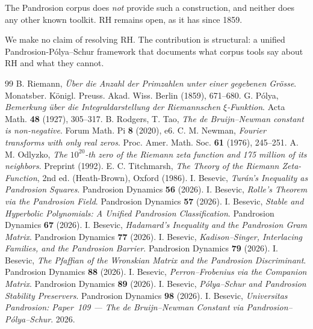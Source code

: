\documentclass[11pt,a4paper]{article}
\begin{document}
The Pandrosion corpus does \emph{not} provide such a construction, and
neither does any other known toolkit. RH remains open, as it has since 1859.

We make no claim of resolving RH. The contribution is structural: a unified
Pandrosion-P\'olya--Schur framework that documents what corpus tools say
about RH and what they cannot.

\begin{thebibliography}{99}
 B. Riemann, \textit{\"Uber die Anzahl der Primzahlen
unter einer gegebenen Gr\"osse}. Monatsber. K\"onigl. Preuss. Akad. Wiss.
Berlin (1859), 671--680.
 G. P\'olya, \textit{Bemerkung \"uber die Integraldarstellung
der Riemannschen $\xi$-Funktion}. Acta Math. \textbf{48} (1927), 305--317.
 B. Rodgers, T. Tao, \textit{The de Bruijn--Newman
constant is non-negative}. Forum Math. Pi \textbf{8} (2020), e6.
 C. M. Newman, \textit{Fourier transforms with only real
zeros}. Proc. Amer. Math. Soc. \textbf{61} (1976), 245--251.
 A. M. Odlyzko, \textit{The $10^{20}$-th zero of the Riemann
zeta function and 175 million of its neighbors}. Preprint (1992).
 E. C. Titchmarsh, \textit{The Theory of the Riemann
Zeta-Function}, 2nd ed. (Heath-Brown), Oxford (1986).
 I. Besevic, \textit{Tur\'an's Inequality as Pandrosion
Squares}. Pandrosion Dynamics \textbf{56} (2026).
 I. Besevic, \textit{Rolle's Theorem via the Pandrosion
Field}. Pandrosion Dynamics \textbf{57} (2026).
 I. Besevic, \textit{Stable and Hyperbolic Polynomials:
A Unified Pandrosion Classification}. Pandrosion Dynamics \textbf{67} (2026).
 I. Besevic, \textit{Hadamard's Inequality and the
Pandrosion Gram Matrix}. Pandrosion Dynamics \textbf{77} (2026).
 I. Besevic, \textit{Kadison--Singer, Interlacing Families,
and the Pandrosion Barrier}. Pandrosion Dynamics \textbf{79} (2026).
 I. Besevic, \textit{The Pfaffian of the Wronskian Matrix
and the Pandrosion Discriminant}. Pandrosion Dynamics \textbf{88} (2026).
 I. Besevic, \textit{Perron--Frobenius via the Companion
Matrix}. Pandrosion Dynamics \textbf{89} (2026).
 I. Besevic, \textit{P\'olya--Schur and Pandrosion
Stability Preservers}. Pandrosion Dynamics \textbf{98} (2026).
 I. Besevic, \textit{Universitas Pandrosion: Paper~109
--- The de Bruijn--Newman Constant via Pandrosion--P\'olya--Schur}. 2026.
\end{thebibliography}
\end{document}

